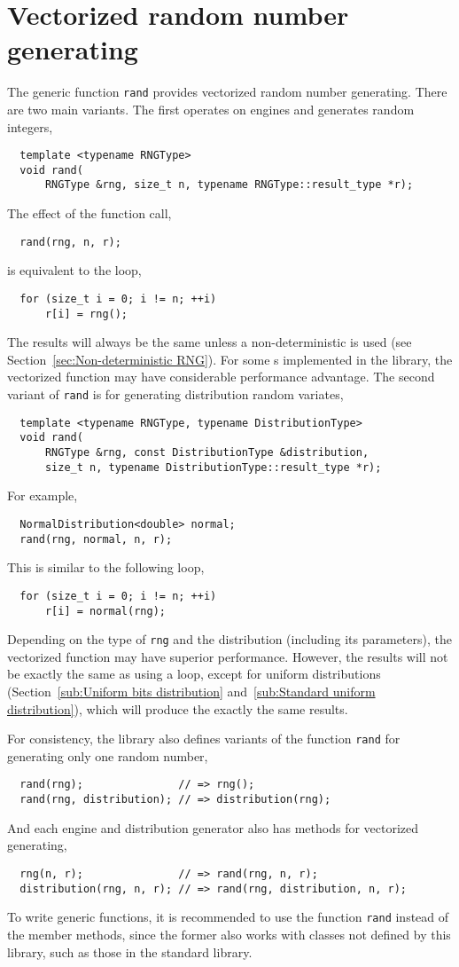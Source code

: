 \section{Vectorized random number generating}
\label{sec:Vectorized random number generating}

The generic function \verb|rand| provides vectorized random number generating.
There are two main variants. The first operates on \rng engines and generates
random integers,
\begin{Verbatim}
  template <typename RNGType>
  void rand(
      RNGType &rng, size_t n, typename RNGType::result_type *r);
\end{Verbatim}
The effect of the function call,
\begin{Verbatim}
  rand(rng, n, r);
\end{Verbatim}
is equivalent to the loop,
\begin{Verbatim}
  for (size_t i = 0; i != n; ++i)
      r[i] = rng();
\end{Verbatim}
The results will always be the same unless a non-deterministic \rng is used
(see Section~\ref{sec:Non-deterministic RNG}). For some \rng{}s implemented in
the library, the vectorized function may have considerable performance
advantage. The second variant of \verb|rand| is for generating distribution
random variates,
\begin{Verbatim}
  template <typename RNGType, typename DistributionType>
  void rand(
      RNGType &rng, const DistributionType &distribution,
      size_t n, typename DistributionType::result_type *r);
\end{Verbatim}
For example,
\begin{Verbatim}
  NormalDistribution<double> normal;
  rand(rng, normal, n, r);
\end{Verbatim}
This is similar to the following loop,
\begin{Verbatim}
  for (size_t i = 0; i != n; ++i)
      r[i] = normal(rng);
\end{Verbatim}
Depending on the type of \verb|rng| and the distribution (including its
parameters), the vectorized function may have superior performance. However,
the results will not be exactly the same as using a loop, except for uniform
distributions (Section~\ref{sub:Uniform bits distribution}
and~\ref{sub:Standard uniform distribution}), which will produce the exactly
the same results.

For consistency, the library also defines variants of the function \verb|rand|
for generating only one random number,
\begin{Verbatim}
  rand(rng);               // => rng();
  rand(rng, distribution); // => distribution(rng);
\end{Verbatim}
And each \rng engine and distribution generator also has methods for vectorized
generating,
\begin{Verbatim}
  rng(n, r);               // => rand(rng, n, r);
  distribution(rng, n, r); // => rand(rng, distribution, n, r);
\end{Verbatim}
To write generic functions, it is recommended to use the function \verb|rand|
instead of the member methods, since the former also works with classes not
defined by this library, such as those in the standard library.

